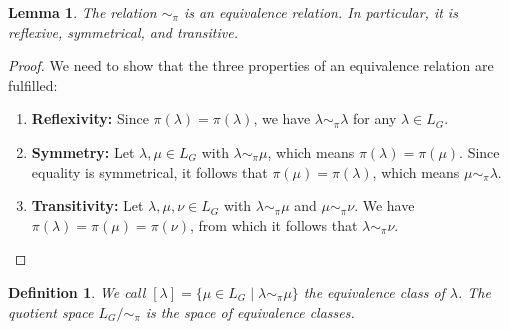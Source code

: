 \documentclass[10pt,twocolumn]{article}
\newtheorem{definition}{Definition}[section]
\newtheorem{lemma}[theorem]{Lemma}
\begin{document}
\begin{lemma}
The relation \( \sim_{\pi} \) is an equivalence relation. In particular, it is reflexive, symmetrical, and transitive.
\end{lemma}

\begin{proof}
We need to show that the three properties of an equivalence relation are fulfilled:
\begin{enumerate}
    \item \textbf{Reflexivity:} Since \( \pi(\lambda) = \pi(\lambda) \), we have \( \lambda \sim_{\pi} \lambda \) for any \( \lambda \in L_G \).
    \item \textbf{Symmetry:} Let \( \lambda, \mu \in L_G \) with \( \lambda \sim_{\pi} \mu \), which means \( \pi(\lambda) = \pi(\mu) \). Since equality is symmetrical, it follows that \( \pi(\mu) = \pi(\lambda) \), which means \( \mu \sim_{\pi} \lambda \).
    \item \textbf{Transitivity:} Let \( \lambda, \mu, \nu \in L_G \) with \( \lambda \sim_{\pi} \mu \) and \( \mu \sim_{\pi} \nu \). We have \( \pi(\lambda) = \pi(\mu) = \pi(\nu) \), from which it follows that \( \lambda \sim_{\pi} \nu \).
\end{enumerate}
\end{proof}



\begin{definition}
We call \( [\lambda] = \{\mu \in L_G \mid \lambda \sim_{\pi} \mu\} \) the equivalence class of \( \lambda \).  
The quotient space \( L_G / \sim_{\pi} \) is the space of equivalence classes.
\end{definition}
\end{document}
